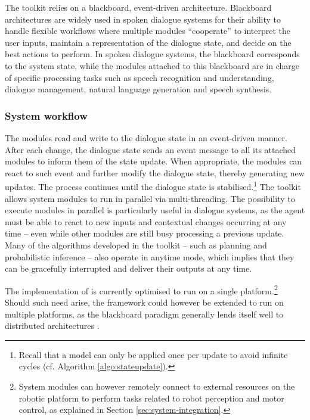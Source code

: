 The \opendial toolkit relies on a blackboard, event-driven architecture. Blackboard architectures are widely used in spoken dialogue systems for their ability to handle flexible workflows where multiple modules ``cooperate'' to  interpret the user inputs, maintain a representation of the dialogue state, and decide on the best actions to perform. In spoken dialogue systems, the blackboard corresponds to the system state, while the modules attached to this blackboard are in charge of specific processing tasks such as speech recognition and understanding, dialogue management, natural language generation and speech synthesis. 


\subsubsection*{System workflow}

The modules read and write to the dialogue state in an event-driven manner. After each change, the dialogue state sends an event message to all its attached modules to inform them of the state update. When appropriate, the modules can react to such event and further modify the dialogue state, thereby generating new updates. The process continues until the dialogue state is stabilised.\footnote{Recall that a model can only be applied once per update to avoid infinite cycles (cf. Algorithm \ref{algo:stateupdate}).}   The \opendial toolkit allows system modules to run in parallel via multi-threading. The possibility to execute modules in parallel is particularly useful in dialogue systems, as the agent must be able to react to new inputs and contextual changes occurring at any time -- even while other modules are still busy processing a previous update.  Many of the algorithms developed in the toolkit -- such as planning and probabilistic inference -- also operate in anytime mode, which implies that they can be gracefully interrupted and deliver their outputs at any time.

The implementation of \opendial is currently optimised to run on a single platform.\footnote{System modules can however remotely connect to external resources on the robotic platform to perform tasks related to robot perception and motor control, as explained in Section \ref{sec:system-integration}.} Should such need arise, the framework could however be extended to run on multiple platforms, as the blackboard paradigm generally lends itself well to distributed architectures \citep{Corkill:1988}.

